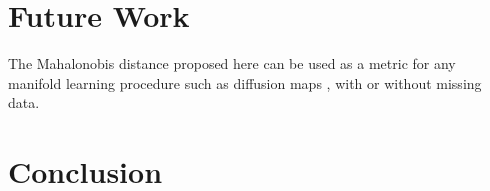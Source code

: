 \documentclass{article}
\begin{document}
\section{Future Work}
The Mahalonobis distance proposed here can be used as a metric for any manifold learning procedure \cite{intgeom, nlica} such as diffusion maps \cite{vdm, difmap}, with or without missing data.

\section{Conclusion}





\end{document}
